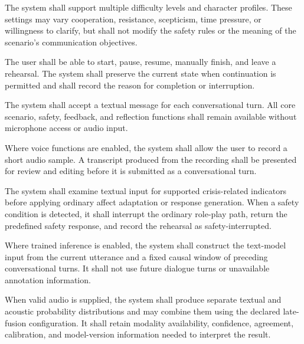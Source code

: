 \begin{description}[leftmargin=!,labelwidth=3.7cm,style=nextline]
    \item[\textbf{FR6. Difficulty and character configuration}]
    The system shall support multiple difficulty levels and character profiles. These settings may vary cooperation, resistance, scepticism, time pressure, or willingness to clarify, but shall not modify the safety rules or the meaning of the scenario's communication objectives.

    \item[\textbf{FR7. Rehearsal lifecycle}]
    The user shall be able to start, pause, resume, manually finish, and leave a rehearsal. The system shall preserve the current state when continuation is permitted and shall record the reason for completion or interruption.

    \item[\textbf{FR8. Text-first interaction}]
    The system shall accept a textual message for each conversational turn. All core scenario, safety, feedback, and reflection functions shall remain available without microphone access or audio input.

    \item[\textbf{FR9. Optional voice input}]
    Where voice functions are enabled, the system shall allow the user to record a short audio sample. A transcript produced from the recording shall be presented for review and editing before it is submitted as a conversational turn.

    \item[\textbf{FR10. Safety precedence}]
    The system shall examine textual input for supported crisis-related indicators before applying ordinary affect adaptation or response generation. When a safety condition is detected, it shall interrupt the ordinary role-play path, return the predefined safety response, and record the rehearsal as safety-interrupted.

    \item[\textbf{FR11. Contextual text inference}]
    Where trained inference is enabled, the system shall construct the text-model input from the current utterance and a fixed causal window of preceding conversational turns. It shall not use future dialogue turns or unavailable annotation information.

    \item[\textbf{FR12. Acoustic inference and multimodal fusion}]
    When valid audio is supplied, the system shall produce separate textual and acoustic probability distributions and may combine them using the declared late-fusion configuration. It shall retain modality availability, confidence, agreement, calibration, and model-version information needed to interpret the result.


\end{description}
